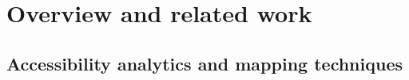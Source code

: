 
\cleardoublepage
\chapter{Overview and related work}
  \label{chap:overv}

  \section{Accessibility analytics and mapping techniques}
    \label{sec:overv:accss}



